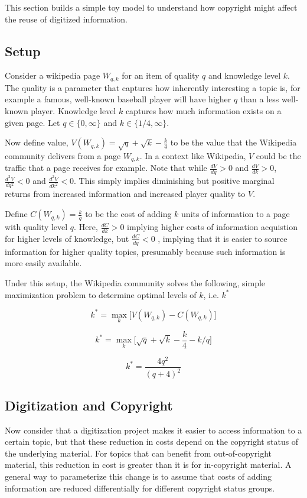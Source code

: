 \label{sec:model}
This section builds a simple toy model to understand how copyright might affect the reuse of digitized information.

\subsection*{Setup}

Consider a wikipedia page $W_{q,k}$ for an item of quality $q$ and knowledge level $k$. The quality is a parameter that captures how inherently interesting a topic is, for example a famous, well-known baseball player will have higher $q$ than a less well-known player. Knowledge level $k$ captures how much information exists on a given page. Let $q \in \{0,\infty\}$ and $k \in \{{1}/{4},\infty\}$.

Now define value, $V(W_{q,k})=\sqrt{q}+\sqrt{k}-\frac{k}{4}$ to be the value that the Wikipedia community delivers from a page $W_{q,k}$.  In a context like Wikipedia, $V$ could be the traffic that a page receives for example. Note that while $\frac{dV}{dq}>0$ and $\frac{dV}{dk}>0$, $\frac{d^2V}{dq^2}<0$ and $\frac{d^2V}{dk^2}<0$. This simply implies diminishing but positive marginal returns from increased information and increased player quality to $V$.

Define $C(W_{q,k})=\frac{k}{q}$ to be the cost of adding $k$ units of information to a page with quality level $q$. Here, $\frac{dC}{dk}>0$ implying higher costs of information acquistion for higher levels of knowledge, but $\frac{dC}{dq}<0$ , implying that it is easier to source information for higher quality topics, presumably because such information is more easily available. 

Under this setup, the Wikipedia community solves the following, simple maximization problem to determine optimal levels of $k$, i.e. $k^*$

$$k^* = \max_k \Big[ V(W_{q,k}) - C(W_{q,k}) \Big]$$

$$k^* = \max_k \Big[\sqrt{q}+\sqrt{k}-\frac{k}{4} - k/q\Big]$$

$$k^* = \frac{4q^2}{(q+4)^2}$$

\subsection*{Digitization and Copyright}

Now consider that a digitization project makes it easier to access information to a certain topic, but that these reduction in costs depend on the copyright status of the underlying material. For topics that can benefit from out-of-copyright material, this reduction in cost is greater than it is for in-copyright material. A general way to parameterize this change is to assume that costs of adding information are reduced differentially for different copyright status groups.

